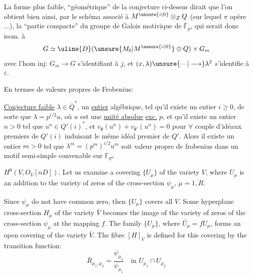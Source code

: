 

La forme plus faible, ``géométrique'' de la conjecture ci-dessus dirait que  l'on obtient bien ainsi, par le schéma associé à $M^{\unsure{\circ|0}}\otimes_ZQ$ (sur lequel $\pi$ opère ...), la  ``partie compacte'' du  groupe de Galois motivique de $\overline{\mathbb F}_p$, qui serait donc isom. à
\[
G\simeq\uline{D}(\unsure{M_0|M^{\unsure{\circ|0}}}\otimes Q)\times G_m
\]
avec l'hom inj: $G_m\longrightarrow G$ s'identifiant à $j$, et  $(x,\lambda)\unsure{\text{—}|\longrightarrow}\lambda^2$ s'identifie à $\varepsilon$.

En termes de valeurs propres de Frobenius:


\uline{Conjecture faible}  $\lambda\in\bar Q^*$,  un \uline{entier} algébrique,  tel qu'il existe un entier $i\geq0$, de sorte que $\lambda=p^{i/2}u$,  où $u$ est une \uline{unité absolue} \uline{exc.} $p$, et qu'il existe un entier $n>0$ tel que $u^n\in Q'(i)^*$, et $v_{\mathfrak p}(u^n)+v_{\mathfrak p'}(u^n)=0$ pour $\forall$ couple d'idéaux premiers de $Q'(i)$ induisant le même idéal premier de $Q'$. Alors il existe un entier $m>0$ tel que $\lambda^m=(p^m)^{i/2}u^m$ soit  valeur propre de frobenius  dans un motif semi-simple  convenable sur $\mathbb F_{q^m}$




$H^0(V,O_V[nD])$. Let us examine a covering $\{U_\mu\}$ of the variety $V$, where $U_\mu$ is an addition to the variety of zeros of the cross-section $\psi_\mu$, $\mu=\overline{1,R}$.

Since $\psi_\mu$ do not have common zero, then $\{U_\mu\}$ covers all $V$. Some hyperplane cross-section $H_\mu$ of the variety $\bar V$ becomes the image of the variety of zeros of the cross-section $\psi_\mu$ at the mapping $f$. The family $\{U_\mu\}$, where $\bar U_\mu=fU_\mu$, forms an open covering of the variety $\bar V$. The fibre $[H]_{\bar V}$ is defined for this covering by the transition function:
\[
\bar R_{\mu_1,\mu_2}=\frac{\psi_{\mu_2}}{\psi_{\mu_1}}\quad\text{in }U_{\mu_1}\cap U_{\mu_2}
\]

